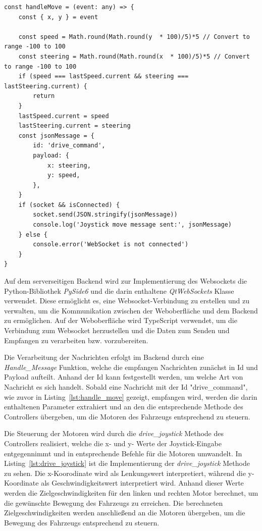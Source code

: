         \begin{lstlisting}[caption={Handler für Joystick-Bewegungen, um Steuerbefehle zu senden}, label={lst:handle_move}]
const handleMove = (event: any) => {
    const { x, y } = event

    const speed = Math.round(Math.round(y  * 100)/5)*5 // Convert to range -100 to 100
    const steering = Math.round(Math.round(x  * 100)/5)*5 // Convert to range -100 to 100
    if (speed === lastSpeed.current && steering === lastSteering.current) {
        return
    }
    lastSpeed.current = speed
    lastSteering.current = steering
    const jsonMessage = {
        id: 'drive_command',
        payload: {
            x: steering,
            y: speed,
        },
    }
    if (socket && isConnected) {
        socket.send(JSON.stringify(jsonMessage))
        console.log('Joystick move message sent:', jsonMessage)
    } else {
        console.error('WebSocket is not connected')
    }
}
        \end{lstlisting}

    Auf dem serverseitigen Backend wird zur Implementierung des Websockets die Python-Bibliothek \emph{PySide6} und die darin enthaltene \emph{QtWebSockets} Klasse verwendet. Diese ermöglicht es, eine Websocket-Verbindung zu erstellen und zu verwalten, um die Kommunikation zwischen der Weboberfläche und dem Backend zu ermöglichen. Auf der Weboberfläche wird TypeScript verwendet, um die Verbindung zum Websocket herzustellen und die Daten zum Senden und Empfangen zu verarbeiten bzw. vorzubereiten.
    
    Die Verarbeitung der Nachrichten erfolgt im Backend durch eine \emph{Handle\_Message} Funktion, welche die empfangen Nachrichten zunächst in Id und Payload aufteilt. Anhand der Id kann festgestellt werden, um welche Art von Nachricht es sich handelt. Sobald eine Nachricht mit der Id "drive\_command", wie zuvor in Listing~\ref{lst:handle_move} gezeigt, empfangen wird, werden die darin enthaltenen Parameter extrahiert und an den die entsprechende Methode des Controllers übergeben, um die Motoren des Fahrzeugs entsprechend zu steuern.

    Die Steuerung der Motoren wird durch die \emph{drive\_joystick} Methode des Controllers realisiert, welche die x- und y- Werte der Joystick-Eingabe entgegennimmt und in entsprechende Befehle für die Motoren umwandelt. In Listing~\ref{lst:drive_joystick} ist die Implementierung der \emph{drive\_joystick} Methode zu sehen. Die x-Koorodinate wird als Lenkungswert interpretiert, während die y-Koordinate als Geschwindigkeitswert interpretiert wird. Anhand dieser Werte werden die Zielgeschwindigkeiten für den linken und rechten Motor berechnet, um die gewünschte Bewegung des Fahrzeugs zu erreichen. Die berechneten Zielgeschwindigkeiten werden anschließend an die Motoren übergeben, um die Bewegung des Fahrzeugs entsprechend zu steuern.

